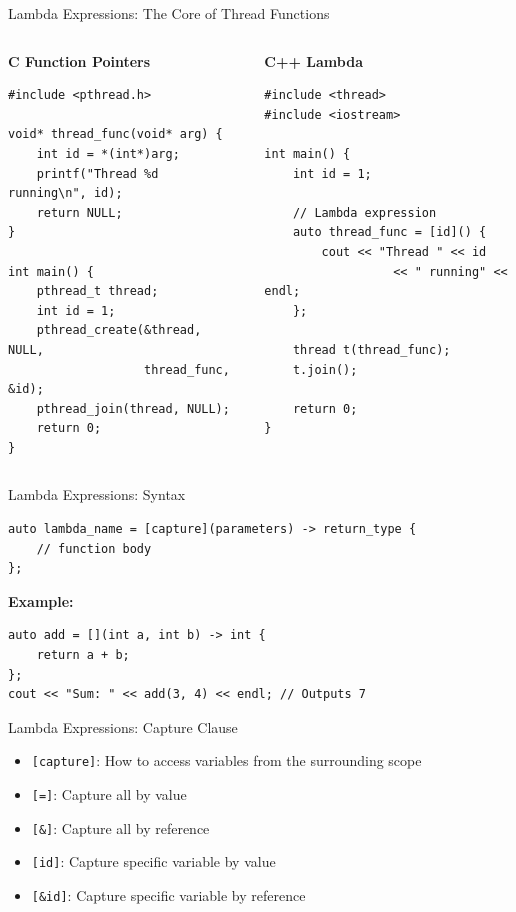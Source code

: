 \begin{frame}[fragile]{Lambda Expressions: The Core of Thread Functions}
	\begin{columns}
		\begin{column}{0.5\textwidth}
			\textbf{C Function Pointers}
			\begin{verbatim}
#include <pthread.h>

void* thread_func(void* arg) {
    int id = *(int*)arg;
    printf("Thread %d running\n", id);
    return NULL;
}

int main() {
    pthread_t thread;
    int id = 1;
    pthread_create(&thread, NULL,
                   thread_func, &id);
    pthread_join(thread, NULL);
    return 0;
}
			\end{verbatim}
		\end{column}
		\begin{column}{0.5\textwidth}
			\textbf{C++ Lambda}
			\begin{verbatim}
#include <thread>
#include <iostream>

int main() {
    int id = 1;

    // Lambda expression
    auto thread_func = [id]() {
        cout << "Thread " << id
                  << " running" << endl;
    };

    thread t(thread_func);
    t.join();

    return 0;
}
			\end{verbatim}
		\end{column}
	\end{columns}

\end{frame}

\begin{frame}[fragile]{Lambda Expressions: Syntax}
	\begin{verbatim}
auto lambda_name = [capture](parameters) -> return_type {
    // function body
};
    \end{verbatim}
	\textbf{Example:}
	\begin{verbatim}
auto add = [](int a, int b) -> int {
    return a + b;
};
cout << "Sum: " << add(3, 4) << endl; // Outputs 7
    \end{verbatim}
\end{frame}

\begin{frame}[fragile]{Lambda Expressions: Capture Clause}
	\begin{itemize}
		\item \texttt{[capture]}: How to access variables from the surrounding scope
		\item \texttt{[=]}: Capture all by value
		\item \texttt{[\&]}: Capture all by reference
		\item \texttt{[id]}: Capture specific variable by value
		\item \texttt{[\&id]}: Capture specific variable by reference
	\end{itemize}
\end{frame}

